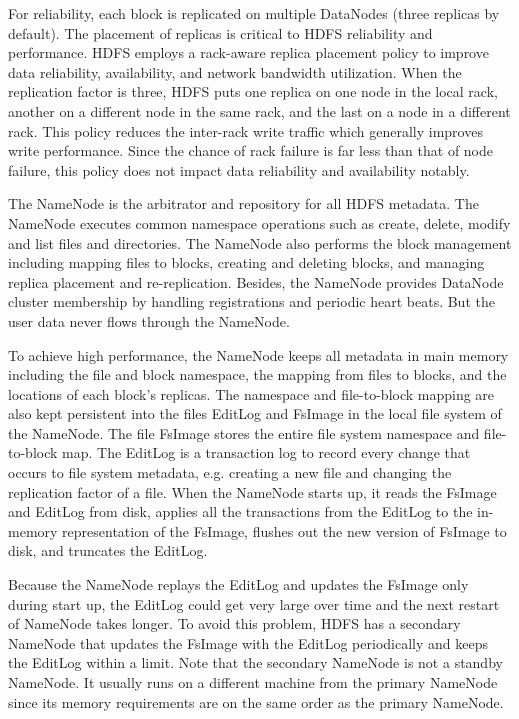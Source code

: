 \documentclass[11pt]{book}
\begin{document}
For reliability, each block is replicated on multiple DataNodes (three replicas by default). The placement of replicas is critical to HDFS reliability and performance.  HDFS employs a rack-aware replica placement policy to improve data reliability, availability, and network bandwidth utilization. 
When the replication factor is three, HDFS puts one replica on one node in the local rack, another on a different node in the same rack, and the last on a node in a different rack. This policy reduces the inter-rack write traffic which generally improves write performance. Since the chance of rack failure is far less than that of node failure, this policy does not impact data reliability and availability notably.

The NameNode is the arbitrator and repository for all HDFS metadata. The NameNode executes common namespace operations such as create, delete, modify and list files and directories. The NameNode also performs the block management including mapping files to blocks, creating and deleting blocks, and managing replica placement and re-replication. Besides, the NameNode provides DataNode cluster membership by handling registrations and periodic heart beats. But the user data never flows through the NameNode. 

To achieve high performance, the NameNode keeps all metadata in main memory including the file and block namespace, the mapping from files to blocks, and the locations of each block's replicas. The namespace and file-to-block mapping are also kept persistent into the files EditLog and FsImage in the local file system of the NameNode. The file FsImage stores the entire file system namespace and file-to-block map. The EditLog is a transaction log to record every change that occurs to file system metadata, e.g. creating a new file and changing the replication factor of a file.
When the NameNode starts up, it reads the FsImage and EditLog from disk, applies all the transactions from the EditLog to the in-memory representation of the FsImage, flushes out the new version of FsImage to disk, and truncates the EditLog.
 
Because the NameNode replays the EditLog and updates the FsImage only during start up, the EditLog could get very large over time and the next restart of NameNode takes longer. To avoid this problem, HDFS has a secondary NameNode that updates the FsImage with the EditLog periodically and keeps the EditLog within a limit. Note that the secondary NameNode is not a standby NameNode. It usually runs on a different machine from the primary NameNode since its memory requirements are on the same order as the primary NameNode.
\end{document}
